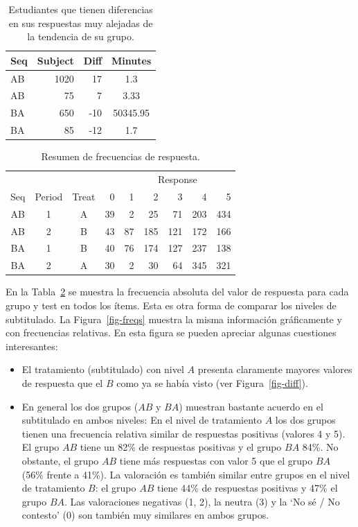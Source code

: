 \documentclass[
  12pt,
  a4paper,
  extrafontsizes,
  onecolumn,
  openright,
  table]{memoir}
\begin{document}
\hypertarget{tbl-diff}{}
\begin{longtable}{lrrc}
\caption{\label{tbl-diff}Estudiantes que tienen diferencias en sus respuestas muy alejadas de la
tendencia de su grupo. }\tabularnewline

\toprule
Seq & Subject & Diff & Minutes \\ 
\midrule
AB & 1020 & 17 & 1.3 \\ 
AB & 75 & 7 & 3.33 \\ 
BA & 650 & -10 & 50345.95 \\ 
BA & 85 & -12 & 1.7 \\ 
\bottomrule
\end{longtable}

\hypertarget{tbl-resume}{}
\begin{longtable}{cccrrrrrr}
\caption{\label{tbl-resume}Resumen de frecuencias de respuesta. }\tabularnewline

\toprule
 &  &  &  & \multicolumn{5}{c}{Response} \\ 
\cmidrule(lr){5-9}
Seq & Period & Treat & 0 & 1 & 2 & 3 & 4 & 5 \\ 
\midrule
AB & 1 & A & 39 & 2 & 25 & 71 & 203 & 434 \\ 
AB & 2 & B & 43 & 87 & 185 & 121 & 172 & 166 \\ 
BA & 1 & B & 40 & 76 & 174 & 127 & 237 & 138 \\ 
BA & 2 & A & 30 & 2 & 30 & 64 & 345 & 321 \\ 
\bottomrule
\end{longtable}

En la Tabla~\ref{tbl-resume} se muestra la frecuencia absoluta del valor
de respuesta para cada grupo y test en todos los ítems. Esta es otra
forma de comparar los niveles de subtitulado. La Figura~\ref{fig-freqs}
muestra la misma información gráficamente y con frecuencias relativas.
En esta figura se pueden apreciar algunas cuestiones interesantes:

\begin{itemize}
\item
  El tratamiento (subtitulado) con nivel \(A\) presenta claramente
  mayores valores de respuesta que el \(B\) como ya se había visto (ver
  Figura~\ref{fig-diff}).
\item
  En general los dos grupos (\(AB\) y \(BA\)) muestran bastante acuerdo
  en el subtitulado en ambos niveles: En el nivel de tratamiento \(A\)
  los dos grupos tienen una frecuencia relativa similar de respuestas
  positivas (valores 4 y 5). El grupo \(AB\) tiene un 82\% de respuestas
  positivas y el grupo \(BA\) 84\%. No obstante, el grupo \(AB\) tiene
  más respuestas con valor 5 que el grupo \(BA\) (56\% frente a 41\%).
  La valoración es también similar entre grupos en el nivel de
  tratamiento \(B\): el grupo \(AB\) tiene 44\% de respuestas positivas
  y 47\% el grupo \(BA\). Las valoraciones negativas (1, 2), la neutra
  (3) y la \enquote*{No sé / No contesto} (0) son también muy similares
  en ambos grupos.
\end{itemize}
\end{document}
